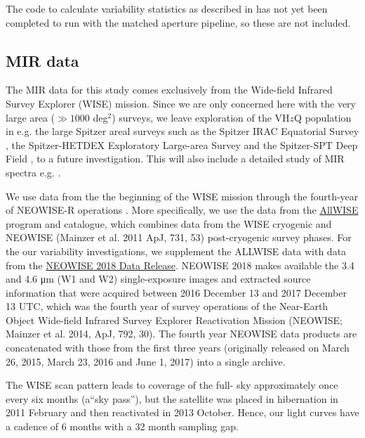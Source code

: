 \documentclass[usenatbib]{mnras}
\begin{document}
    The code to calculate variability statistics as described in \cite{Cross2009} has
    not yet been completed to run with the matched aperture pipeline, so these are
    not included.
    

\subsection{MIR data}
The MIR data for this study comes exclusively from the Wide-field
Infrared Survey Explorer (WISE) mission. Since we are only concerned
here with the very large area ($\gg1000$ deg$^2$) surveys, we leave
exploration of the VH$z$Q population in e.g. the large Spitzer areal
surveys such as the Spitzer IRAC Equatorial Survey \citep[SpIES;
][]{Timlin2016}, the Spitzer-HETDEX Exploratory Large-area Survey
\citep[SHELA; ][]{Papovich2016} and the Spitzer-SPT Deep Field
\citep[SSDF; ][]{Ashby2013}, to a future investigation. This will also
include a detailed study of MIR spectra e.g. \citet{Lambrides2018}.

We use data from the the beginning of the WISE mission \citep[2010
January; ][]{Wright2010} through the fourth-year of NEOWISE-R
operations \citep[2017 December;]{Mainzer2011}. More specifically, we
use the data from the
\href{http://wise2.ipac.caltech.edu/docs/release/allwise/}{AllWISE}
program and catalogue, which combines data from the WISE cryogenic and
NEOWISE (Mainzer et al. 2011 ApJ, 731, 53) post-cryogenic survey
phases. For the our variability investigations, we supplement the
ALLWISE data with data from the
\href{http://wise2.ipac.caltech.edu/docs/release/neowise/neowise_2018_release_intro.html}{NEOWISE
2018 Data Release}. NEOWISE 2018 makes available the 3.4 and 4.6 μm
(W1 and W2) single-exposure images and extracted source information
that were acquired between 2016 December 13 and 2017 December 13 UTC,
which was the fourth year of survey operations of the Near-Earth
Object Wide-field Infrared Survey Explorer Reactivation Mission
(NEOWISE; Mainzer et al. 2014, ApJ, 792, 30). The fourth year NEOWISE
data products are concatenated with those from the first three years
(originally released on March 26, 2015, March 23, 2016 and June 1,
2017) into a single archive.

The WISE scan pattern leads to coverage of the full- sky approximately
once every six months (a``sky pass''), but the satellite was placed in
hibernation in 2011 February and then reactivated in 2013
October. Hence, our light curves have a cadence of 6 months with a 32
month sampling gap.
\end{document}
